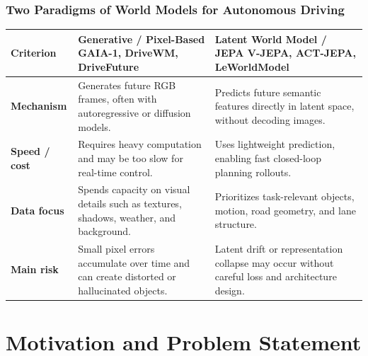 \begin{frame}
  \frametitle{Two Paradigms of World Models for Autonomous Driving}
  \setlength{\tabcolsep}{3pt}
  \begin{tabular}{>{\raggedright\arraybackslash}p{}|>{\raggedright\arraybackslash}p{}|>{\raggedright\arraybackslash}p{}}
    \textbf{Criterion} & \textbf{Generative / Pixel-Based} \newline \scriptsize GAIA-1, DriveWM, DriveFuture & \textbf{Latent World Model / JEPA} \newline \scriptsize V-JEPA, ACT-JEPA, LeWorldModel \\
    \hline
    \textbf{Mechanism} & Generates future RGB frames, often with autoregressive or diffusion models. & Predicts future semantic features directly in latent space, without decoding images. \\
    \textbf{Speed / cost} & Requires heavy computation and may be too slow for real-time control. & Uses lightweight prediction, enabling fast closed-loop planning rollouts. \\
    \textbf{Data focus} & Spends capacity on visual details such as textures, shadows, weather, and background. & Prioritizes task-relevant objects, motion, road geometry, and lane structure. \\
    \textbf{Main risk} & Small pixel errors accumulate over time and can create distorted or hallucinated objects. & Latent drift or representation collapse may occur without careful loss and architecture design. \\
  \end{tabular}
\end{frame}

\section{Motivation and Problem Statement}

